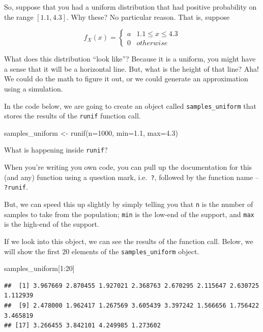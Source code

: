 \documentclass[
]{book}
\newenvironment{Shaded}{\begin{snugshade}}{\end{snugshade}}
\newcommand{\AttributeTok}[1]{\textcolor[rgb]{0.77,0.63,0.00}{#1}}
\newcommand{\DecValTok}[1]{\textcolor[rgb]{0.00,0.00,0.81}{#1}}
\newcommand{\FloatTok}[1]{\textcolor[rgb]{0.00,0.00,0.81}{#1}}
\newcommand{\FunctionTok}[1]{\textcolor[rgb]{0.00,0.00,0.00}{#1}}
\newcommand{\NormalTok}[1]{#1}
\newcommand{\OtherTok}[1]{\textcolor[rgb]{0.56,0.35,0.01}{#1}}
\newcommand{\SpecialCharTok}[1]{\textcolor[rgb]{0.00,0.00,0.00}{#1}}
\theoremstyle{definition}
\theoremstyle{definition}
\theoremstyle{definition}
\theoremstyle{definition}
\theoremstyle{remark}
\begin{document}
So, suppose that you had a uniform distribution that had positive probability on the range \([1.1, 4.3]\). Why these? No particular reason. That is, suppose

\[
  f_{X}(x) = \begin{cases} 
    a & 1.1 \leq x \leq 4.3 \\ 
    0 & otherwise
  \end{cases}
\]

What does this distribution ``look like''? Because it is a uniform, you might have a sense that it will be a horizontal line. But, what is the height of that line? Aha! We could do the math to figure it out, or we could generate an approximation using a simulation.

In the code below, we are going to create an object called \texttt{samples\_uniform} that stores the results of the \texttt{runif} function call.

\begin{Shaded}
\begin{Highlighting}[]
\NormalTok{samples\_uniform }\OtherTok{\textless{}{-}} \FunctionTok{runif}\NormalTok{(}\AttributeTok{n=}\DecValTok{1000}\NormalTok{, }\AttributeTok{min=}\FloatTok{1.1}\NormalTok{, }\AttributeTok{max=}\FloatTok{4.3}\NormalTok{)}
\end{Highlighting}
\end{Shaded}

What is happening inside \texttt{runif}?

When you're writing you own code, you can pull up the documentation for this (and any) function using a question mark, i.e.~\texttt{?}, followed by the function name -- \texttt{?runif}.

But, we can speed this up slightly by simply telling you that \texttt{n} is the number of samples to take from the population; \texttt{min} is the low-end of the support, and \texttt{max} is the high-end of the support.

If we look into this object, we can see the results of the function call. Below, we will show the first \(20\) elements of the \texttt{samples\_uniform} object.

\begin{Shaded}
\begin{Highlighting}[]
\NormalTok{samples\_uniform[}\DecValTok{1}\SpecialCharTok{:}\DecValTok{20}\NormalTok{]}
\end{Highlighting}
\end{Shaded}

\begin{verbatim}
##  [1] 3.967669 2.870455 1.927021 2.368763 2.670295 2.115647 2.630725 1.112939
##  [9] 2.478000 1.962417 1.267569 3.605439 3.397242 1.566656 1.756422 3.465819
## [17] 3.266455 3.842101 4.249985 1.273602
\end{verbatim}
\end{document}

